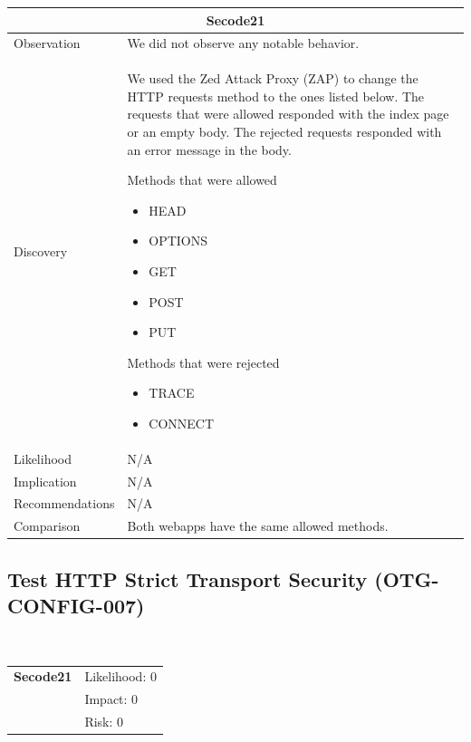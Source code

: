 \documentclass[headsepline,footsepline,footinclude=false,oneside,fontsize=11pt,paper=a4,listof=totoc,bibliography=totoc]{scrbook} %
\begin{document}
\begin{tabular}{ l|p{11cm}  }
	\hline
	\multicolumn{2}{c}{\textbf{Secode21}} \\
	\hline
	Observation   &  We did not observe any notable behavior.  \\
	Discovery  &  We used the Zed  Attack  Proxy  (ZAP)	to change the HTTP requests method to the ones listed below. The requests that were allowed responded
	with the index page or an empty body. The rejected requests responded with an
	error message in the body.\

	Methods that were allowed\

	\begin{itemize}
		\item HEAD
		\item OPTIONS
		\item GET
		\item POST
		\item PUT
	\end{itemize}

	Methods that were rejected\

	\begin{itemize}
		\item TRACE
		\item CONNECT
	\end{itemize} \\

	Likelihood & N/A \\
	Implication    & N/A \\
	Recommendations & N/A \\
	Comparison &  Both webapps have the same allowed methods.\\
	\hline
\end{tabular}



\pagebreak
\subsection{Test HTTP Strict Transport Security (OTG-CONFIG-007)}\
\begin{tabular}{cR{12cm}}
	\textbf{Secode21} & Likelihood: 0\\& Impact: 0\\& Risk: 0
\end{tabular}
\end{document}
